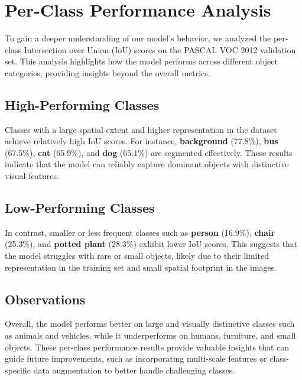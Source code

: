 
\section{Per-Class Performance Analysis}
\label{sec:per_class_performance_analysis}

To gain a deeper understanding of our model’s behavior, we analyzed the per-class Intersection over Union (IoU) scores on the PASCAL VOC 2012 validation set. This analysis highlights how the model performs across different object categories, providing insights beyond the overall metrics.

\subsection{High-Performing Classes}

Classes with a large spatial extent and higher representation in the dataset achieve relatively high IoU scores. For instance, \textbf{background} (77.8\%), \textbf{bus} (67.5\%), \textbf{cat} (65.9\%), and \textbf{dog} (65.1\%) are segmented effectively. These results indicate that the model can reliably capture dominant objects with distinctive visual features.

\subsection{Low-Performing Classes}

In contrast, smaller or less frequent classes such as \textbf{person} (16.9\%), \textbf{chair} (25.3\%), and \textbf{potted plant} (28.3\%) exhibit lower IoU scores. This suggests that the model struggles with rare or small objects, likely due to their limited representation in the training set and small spatial footprint in the images.

\subsection{Observations}

Overall, the model performs better on large and visually distinctive classes such as animals and vehicles, while it underperforms on humans, furniture, and small objects. These per-class performance results provide valuable insights that can guide future improvements, such as incorporating multi-scale features or class-specific data augmentation to better handle challenging classes.


